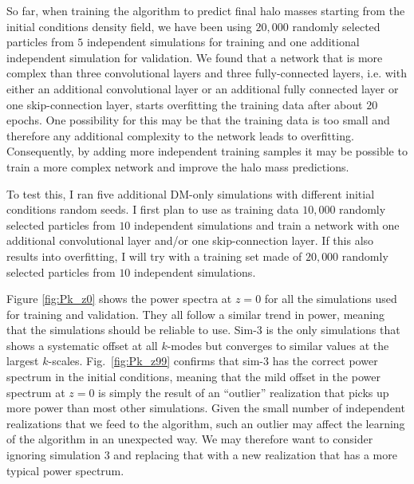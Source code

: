 \documentclass[11pt]{article}
\begin{document}
So far, when training the algorithm to predict final halo masses starting from the initial conditions density field, we have been using $20,000$ randomly selected particles from $5$ independent simulations for training and one additional independent simulation for validation. We found that a network that is more complex than three convolutional layers and three fully-connected layers, i.e. with either an additional convolutional layer or an additional fully connected layer or one skip-connection layer, starts overfitting the training data after about $20$ epochs. One possibility for this may be that the training data is too small and therefore any additional complexity to the network leads to overfitting. Consequently, by adding more independent training samples it may be possible to train a more complex network and improve the halo mass predictions.

To test this, I ran five additional DM-only simulations with different initial conditions random seeds. I first plan to use as training data $10,000$ randomly selected particles from $10$ independent simulations and train a network with one additional convolutional layer and/or one skip-connection layer. If this also results into overfitting, I will try with a training set made of $20,000$ randomly selected particles from $10$ independent simulations.

Figure \ref{fig:Pk_z0} shows the power spectra at $z=0$ for all the simulations used for training and validation. They all follow a similar trend in power, meaning that the simulations should be reliable to use. Sim-$3$ is the only simulations that shows a systematic offset at all $k$-modes but converges to similar values at the largest $k$-scales. Fig.~\ref{fig:Pk_z99} confirms that sim-$3$ has the correct power spectrum in the initial conditions, meaning that the mild offset in the power spectrum at $z=0$ is simply the result of an ``outlier'' realization that picks up more power than most other simulations. Given the small number of independent realizations that we feed to the algorithm, such an outlier may affect the learning of the algorithm in an unexpected way. We may therefore want to consider ignoring simulation $3$ and replacing that with a new realization that has a more typical power spectrum.
\end{document}
